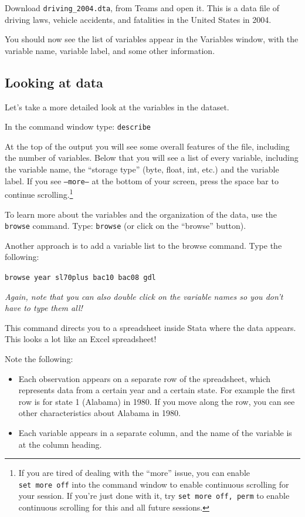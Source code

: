 \documentclass[11pt]{article}
\begin{document}
Download \texttt{driving\_2004.dta}, from Teams and open it. This is a
data file of driving laws, vehicle accidents, and fatalities in the
United States in 2004.

You should now see the list of variables appear in the Variables window,
with the variable name, variable label, and some other information.

\hypertarget{looking-at-data}{%
\subsection*{Looking at data}\label{looking-at-data}}

Let's take a more detailed look at the variables in the dataset.

In the command window type: \texttt{describe}

At the top of the output you will see some overall features of the file,
including the number of variables. Below that you will see a list of
every variable, including the variable name, the ``storage type'' (byte,
float, int, etc.) and the variable label. If you see \texttt{–more–} at
the bottom of your screen, press the space bar to continue
scrolling.\footnote{If you are tired of dealing with the ``more'' issue,
  you can enable \texttt{set\ more\ off} into the command window to
  enable continuous scrolling for your session. If you're just done with
  it, try \texttt{set\ more\ off,\ perm} to enable continuous scrolling
  for this and all future sessions.}

To learn more about the variables and the organization of the data, use
the \texttt{browse} command. Type: \texttt{browse} (or click on the
``browse'' button).

Another approach is to add a variable list to the browse command. Type
the following:

\texttt{browse\ year\ sl70plus\ bac10\ bac08\ gdl}

\emph{Again, note that you can also double click on the variable names
so you don't have to type them all!}

This command directs you to a spreadsheet inside Stata where the data
appears. This looks a lot like an Excel spreadsheet!

Note the following:

\begin{itemize}
\item
  Each observation appears on a separate row of the spreadsheet, which
  represents data from a certain year and a certain state. For example
  the first row is for state 1 (Alabama) in 1980. If you move along the
  row, you can see other characteristics about Alabama in 1980.
\item
  Each variable appears in a separate column, and the name of the
  variable is at the column heading.
\end{itemize}
\end{document}
